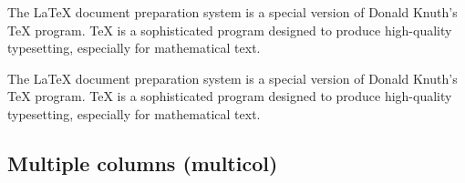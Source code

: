 \begin{filecontents*}{\democodefile}
\begin{FlushRight}
The \LaTeX{} document preparation 
system is a special version of Donald
Knuth's \TeX{} program. \TeX{} is a 
sophisticated program designed to 
produce high-quality typesetting, 
especially for mathematical text.
\end{FlushRight}
\end{filecontents*}

\begin{filecontents*}{\democodefile}
\begin{Centering}
The \LaTeX{} document preparation 
system is a special version of Donald
Knuth's \TeX{} program. \TeX{} is a 
sophisticated program designed to 
produce high-quality typesetting, 
especially for mathematical text.
\end{Centering}
\end{filecontents*}

%

\subsection{Multiple columns (multicol)}


